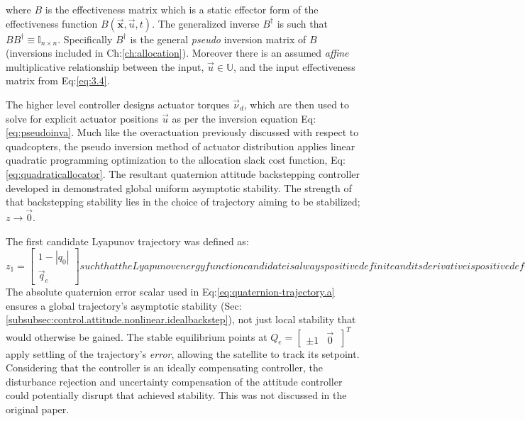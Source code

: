 where $B$ is the effectiveness matrix which is a static effector form of the effectiveness function $B(\vec{\mathbf{x}},\vec{u},t)$. The generalized inverse $B^{\dagger}$ is such that $BB^{\dagger}\equiv\mathbb{I}_{n\times n}$. Specifically $B^{\dagger}$ is the general \emph{pseudo} inversion matrix of $B$ (inversions included in Ch:\ref{ch:allocation}). Moreover there is an assumed \emph{affine} multiplicative relationship between the input, $\vec{u}\in\mathbb{U}$, and the input effectiveness matrix from Eq:\ref{eq:3.4}. 
\par
The higher level controller designs actuator torques $\vec{\nu}_d$, which are then used to solve for explicit actuator positions $\vec{u}$ as per the inversion equation Eq:\ref{eq:pseudoinva}. Much like the overactuation previously discussed with respect to quadcopters, the pseudo inversion method of actuator distribution applies linear quadratic programming optimization to the allocation slack cost function, Eq:\ref{eq:quadraticallocator}. The resultant quaternion attitude backstepping controller developed in \cite{satellitebackstepping} demonstrated global uniform asymptotic stability. The strength of that backstepping stability lies in the choice of trajectory aiming to be stabilized; $z\rightarrow\vec{0}$. 
\par
The first candidate Lyapunov trajectory was defined as:
\begin{subequations}
\begin{equation}\label{eq:quaternion-trajectory.a}
z_1=\begin{bmatrix}
1-|q_0|\\
\vec{q}_e
\end{bmatrix}
\end{equation}
such that the Lyapunov energy function candidate is always positive definite and its derivative is positive definite descrescent. The particulars of that stability proof are omitted but it is worth detailing their chosen candidate function:
\begin{equation}
V_1(z)=z_1\text{}^Tz_1>0~~~~\forall[q_0,\vec{q}_e]
\end{equation}
\end{subequations}
The absolute quaternion error scalar used in Eq:\ref{eq:quaternion-trajectory.a} ensures a global trajectory's asymptotic stability (Sec:\ref{subsubsec:control.attitude.nonlinear.idealbackstep}), not just local stability that would otherwise be gained. The stable equilibrium points at $Q_e=\begin{bmatrix}
\pm 1 & \vec{0}~
\end{bmatrix}^T$ apply settling of the trajectory's \emph{error}, allowing the satellite to track its setpoint. Considering that the controller is an ideally compensating controller, the disturbance rejection and uncertainty compensation of the attitude controller could potentially disrupt that achieved stability. This was not discussed in the original paper.